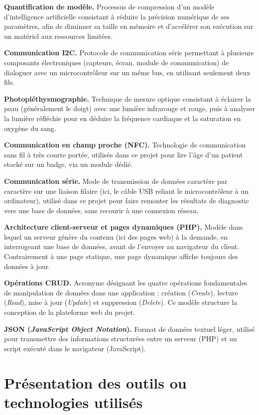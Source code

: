 \documentclass[12pt,a4paper]{report}
\begin{document}
\textbf{Quantification de modèle.} Processus de compression d'un modèle d'intelligence artificielle consistant à réduire la précision numérique de ses paramètres, afin de diminuer sa taille en mémoire et d'accélérer son exécution sur un matériel aux ressources limitées.

\textbf{Communication I2C.} Protocole de communication série permettant à plusieurs composants électroniques (capteurs, écran, module de communication) de dialoguer avec un microcontrôleur sur un même bus, en utilisant seulement deux fils.

\textbf{Photopléthysmographie.} Technique de mesure optique consistant à éclairer la peau (généralement le doigt) avec une lumière infrarouge et rouge, puis à analyser la lumière réfléchie pour en déduire la fréquence cardiaque et la saturation en oxygène du sang.

\textbf{Communication en champ proche (NFC).} Technologie de communication sans fil à très courte portée, utilisée dans ce projet pour lire l'âge d'un patient stocké sur un badge, via un module dédié.

\textbf{Communication série.} Mode de transmission de données caractère par caractère sur une liaison filaire (ici, le câble USB reliant le microcontrôleur à un ordinateur), utilisé dans ce projet pour faire remonter les résultats de diagnostic vers une base de données, sans recourir à une connexion réseau.

\textbf{Architecture client-serveur et pages dynamiques (PHP).} Modèle dans lequel un serveur génère du contenu (ici des pages web) à la demande, en interrogeant une base de données, avant de l'envoyer au navigateur du client. Contrairement à une page statique, une page dynamique affiche toujours des données à jour.

\textbf{Opérations CRUD.} Acronyme désignant les quatre opérations fondamentales de manipulation de données dans une application : création (\textit{Create}), lecture (\textit{Read}), mise à jour (\textit{Update}) et suppression (\textit{Delete}). Ce modèle structure la conception de la plateforme web du projet.

\textbf{JSON (\textit{JavaScript Object Notation}).} Format de données textuel léger, utilisé pour transmettre des informations structurées entre un serveur (PHP) et un script exécuté dans le navigateur (JavaScript).

\section{Présentation des outils ou technologies utilisés}
\end{document}
